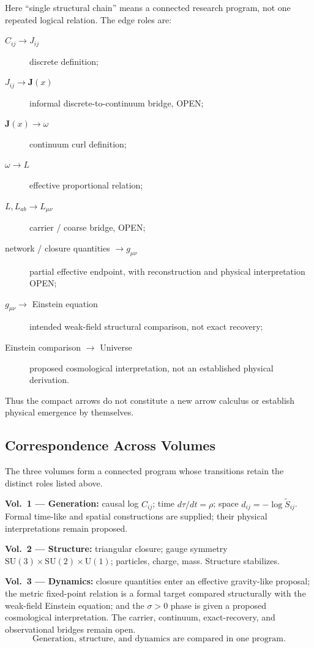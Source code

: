 Here ``single structural chain'' means a connected research program, not one
repeated logical relation.  The edge roles are:
\begin{description}
  \item[$C_{ij}\to J_{ij}$] discrete definition;
  \item[$J_{ij}\to\mathbf J(x)$] informal discrete-to-continuum bridge, OPEN;
  \item[$\mathbf J(x)\to\omega$] continuum curl definition;
  \item[$\omega\to L$] effective proportional relation;
  \item[$L,L_{ab}\to L_{\mu\nu}$] carrier / coarse bridge, OPEN;
  \item[network / closure quantities $\to g_{\mu\nu}$] partial effective
        endpoint, with reconstruction and physical interpretation OPEN;
  \item[$g_{\mu\nu}\to$ Einstein equation] intended weak-field structural
        comparison, not exact recovery;
  \item[Einstein comparison $\to$ Universe] proposed cosmological
        interpretation, not an established physical derivation.
\end{description}
Thus the compact arrows do not constitute a new arrow calculus or establish
physical emergence by themselves.

\subsection{Correspondence Across Volumes}

The three volumes form a connected program whose transitions retain the
distinct roles listed above.

\textbf{Vol.~1 --- Generation:}
causal log $C_{ij}$; time $d\tau/dt = \rho$;
space $d_{ij} = -\log\tilde{S}_{ij}$.
Formal time-like and spatial constructions are supplied; their physical
interpretations remain proposed.

\textbf{Vol.~2 --- Structure:}
triangular closure;
gauge symmetry $\mathrm{SU}(3)\times\mathrm{SU}(2)\times\mathrm{U}(1)$;
particles, charge, mass.
Structure stabilizes.

\textbf{Vol.~3 --- Dynamics:}
closure quantities enter an effective gravity-like proposal; the metric
fixed-point relation is a formal target compared structurally with the
weak-field Einstein equation; and the $\sigma > 0$ phase is given a proposed
cosmological interpretation.  The carrier, continuum, exact-recovery, and
observational bridges remain open.
\begin{equation}
  \boxed{\text{Generation, structure, and dynamics are compared in one program.}}
\end{equation}

